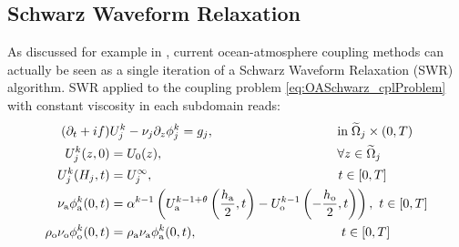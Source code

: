 \subsection{Schwarz Waveform Relaxation}
As discussed for example in \citep{marti_schwarz_2021},
current ocean-atmosphere coupling methods can actually be seen as a 
single iteration of a Schwarz Waveform Relaxation (SWR) algorithm. 
SWR applied to the coupling problem \eqref{eq:OASchwarz_cplProblem}
with constant viscosity in each subdomain reads:
%
\begin{subequations}
\label{eq:SWRbulk}
\begin{align}
(\partial_t + if) &U^k_j - \nu_j\partial_z \phi^k_j  = g_j, 
\hspace{3.4cm} \mbox{in}\;\widetilde{\Omega}_j \times (0,T) \label{eq:ref} \\
U^k_j(z,0) &= U_0(z),   \hspace{4.8cm}  \forall z \in \widetilde{\Omega}_j  \\
U^k_j(H_j, t) &= U^\infty_j, \hspace{5.1cm}  t \in [0,T]\\
\nu_{\rm a}\phi_{\rm a}^{k}(0,t) &=  \alpha^{k-1} 
\left( U_{\rm a}^{k-1+\theta}\left(\frac{h_{\rm a}}{2},t\right) - U_{\rm o}^{k-1}\left(-\frac{h_{\rm o}}{2},t\right)\right), 
\hspace{0.12cm} t \in [0,T] \label{eq:bulkInterfaceCondition} \\
\rho_{\rm o} \nu_{\rm o}\phi^k_{\rm o}(0,t) &= \rho_{\rm a}
\nu_{\rm a}\phi^k_{\rm a}(0,t), \hspace{3.98cm} t \in [0,T] \label{eq:fluxInterfaceCondition}
\end{align}
\end{subequations}
